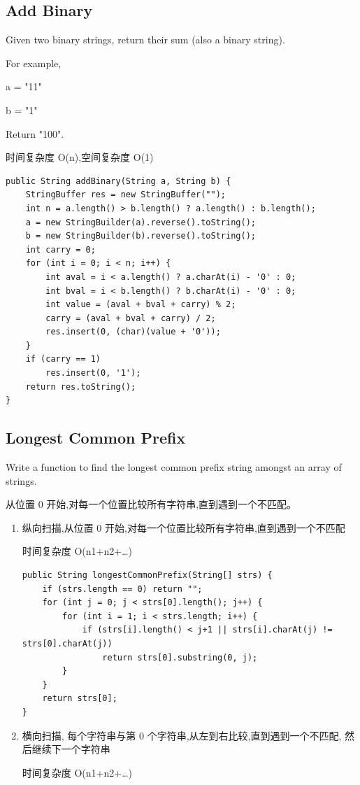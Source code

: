 \documentclass[12pt]{book}
\begin{document}
\subsection{Add Binary}
\label{sec-2-1-4}
Given two binary strings, return their sum (also a binary string).

For example,

a = "11"

b = "1"

Return "100".

时间复杂度 O(n),空间复杂度 O(1)

\lstset{language=java,label= ,caption= ,numbers=none}
\begin{lstlisting}
public String addBinary(String a, String b) {
    StringBuffer res = new StringBuffer("");
    int n = a.length() > b.length() ? a.length() : b.length();
    a = new StringBuilder(a).reverse().toString();
    b = new StringBuilder(b).reverse().toString();
    int carry = 0;
    for (int i = 0; i < n; i++) {
        int aval = i < a.length() ? a.charAt(i) - '0' : 0;
        int bval = i < b.length() ? b.charAt(i) - '0' : 0;
        int value = (aval + bval + carry) % 2;
        carry = (aval + bval + carry) / 2;
        res.insert(0, (char)(value + '0'));
    }
    if (carry == 1)
        res.insert(0, '1');
    return res.toString();
}
\end{lstlisting}

\subsection{Longest Common Prefix}
\label{sec-2-1-5}
Write a function to find the longest common prefix string amongst an
array of strings.

从位置 0 开始,对每一个位置比较所有字符串,直到遇到一个不匹配。

\begin{enumerate}
\item 纵向扫描,从位置 0 开始,对每一个位置比较所有字符串,直到遇到一个不匹配
\label{sec-2-1-5-1}

时间复杂度 O(n1+n2+\ldots{})

\lstset{language=java,label= ,caption= ,numbers=none}
\begin{lstlisting}
public String longestCommonPrefix(String[] strs) {
    if (strs.length == 0) return "";
    for (int j = 0; j < strs[0].length(); j++) {
        for (int i = 1; i < strs.length; i++) {
            if (strs[i].length() < j+1 || strs[i].charAt(j) != strs[0].charAt(j))
                return strs[0].substring(0, j);
        }
    }
    return strs[0];
}
\end{lstlisting}
\item 横向扫描, 每个字符串与第 0 个字符串,从左到右比较,直到遇到一个不匹配, 然后继续下一个字符串
\label{sec-2-1-5-2}

时间复杂度 O(n1+n2+\ldots{})
\end{enumerate}
\end{document}
